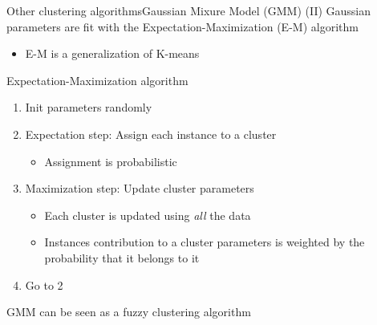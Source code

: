 \documentclass[10pt,compress]{beamer} %
\begin{document}
\begin{frame}{Other clustering algorithms}{Gaussian Mixure Model (GMM) (II)}
    Gaussian parameters are fit with the Expectation-Maximization (E-M) algorithm
       \begin{itemize}
            \item E-M is a generalization of K-means
       \end{itemize}

    \begin{block}{Expectation-Maximization algorithm}
    \begin{enumerate}
       \item Init parameters randomly
       \item Expectation step: Assign each instance to a cluster
            \begin{itemize}
            \item Assignment is probabilistic
            \end{itemize}
       \item Maximization step: Update cluster parameters
            \begin{itemize}
            \item Each cluster is updated using \textit{all} the data
            \item Instances contribution to a cluster parameters is weighted by the probability that it belongs to it
            \end{itemize}
       \item Go to 2
    \end{enumerate} 
    \end{block}

    GMM can be seen as a fuzzy clustering algorithm
\end{frame}
\end{document}
